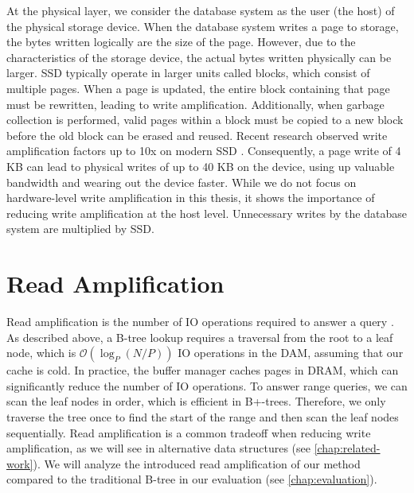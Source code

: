 At the physical layer, we consider the database system as the user (the host) of the physical storage device.
When the database system writes a page to storage, the bytes written logically are the size of the page.
However, due to the characteristics of the storage device, the actual bytes written physically can be larger.
\ac{SSD} typically operate in larger units called blocks, which consist of multiple pages.
When a page is updated, the entire block containing that page must be rewritten, leading to write amplification.
Additionally, when garbage collection is performed, valid pages within a block must be copied to a new block before the old block can be erased and reused.
Recent research observed write amplification factors up to 10x on modern \ac{SSD} \cite{haas2025ssd}.
Consequently, a page write of 4 KB can lead to physical writes of up to 40 KB on the device, using up valuable bandwidth and wearing out the device faster.
While we do not focus on hardware-level write amplification in this thesis, it shows the importance of reducing write amplification at the host level.
Unnecessary writes by the database system are multiplied by \ac{SSD}.


\section{Read Amplification}
Read amplification is the number of \ac{IO} operations required to answer a query \cite{kuszmaul2014fractal}.
As described above, a B-tree lookup requires a traversal from the root to a leaf node, which is $\mathcal{O}(\log_P(N/P))$ \ac{IO} operations in the \ac{DAM}, assuming that our cache is cold.
In practice, the buffer manager caches pages in \ac{DRAM}, which can significantly reduce the number of \ac{IO} operations.
To answer range queries, we can scan the leaf nodes in order, which is efficient in B+-trees.
Therefore, we only traverse the tree once to find the start of the range and then scan the leaf nodes sequentially.
Read amplification is a common tradeoff when reducing write amplification, as we will see in alternative data structures (see \autoref{chap:related-work}).
We will analyze the introduced read amplification of our method compared to the traditional B-tree in our evaluation (see \autoref{chap:evaluation}).

